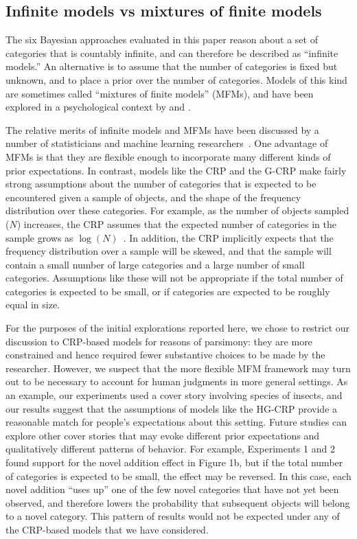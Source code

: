 \documentclass[doc]{apa6}
\begin{document}
\subsection{Infinite models vs mixtures of finite models}

The six Bayesian approaches evaluated in this paper reason about a set of categories that is countably infinite, and can therefore be described as ``infinite models.'' An alternative is to assume that the number of categories is fixed but unknown, and to place a prior over the number of categories. Models of this kind are sometimes called ``mixtures of finite models'' (MFMs), and have been explored in a psychological context by  and .

The relative merits of infinite models and MFMs have been discussed by a number of statisticians and machine learning researchers~\cite{welling2006flexible,wallachjdh10,millerh15}. One advantage of MFMs is that they are flexible enough to incorporate many different kinds of prior expectations. In contrast, models like the CRP and the G-CRP make fairly strong assumptions about the number of categories that is expected to be encountered given a sample of objects, and the shape of the frequency distribution over these categories. For example, as the number of objects sampled ($N$) increases, the CRP assumes that the expected number of categories in the sample grows as $\log(N)$~\cite{arratia2003logarithmic}. In addition, the CRP implicitly expects that the frequency distribution over a sample will be skewed, and that the sample will contain a small number of large categories and a large number of small categories. Assumptions like these will not be appropriate if the total number of categories is expected to be small, or if categories are expected to be roughly equal in size.

For the purposes of the initial explorations reported here, we chose to restrict our discussion to CRP-based models for reasons of parsimony: they are more constrained and hence required fewer substantive choices to be made by the researcher. However, we suspect that the more flexible MFM framework may turn out to be necessary to account for human judgments in more general settings. As an example, our experiments used a cover story involving species of insects, and our results suggest that the assumptions of models like the HG-CRP provide a reasonable match for people's expectations about this setting.  Future studies can explore other cover stories that may evoke different prior expectations and qualitatively different patterns of behavior. For example, Experiments 1 and 2 found support for the novel addition effect in Figure 1b, but if the total number of categories is expected to be small, the effect may be reversed. In this case, each novel addition ``uses up'' one of the few novel categories that have not yet been observed, and therefore lowers the probability that subsequent objects will belong to a novel category. This pattern of results would not be expected under any of the CRP-based models that we have considered.
\end{document}
